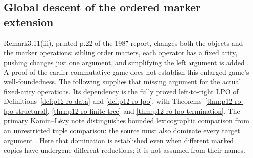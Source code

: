 \subsection{Global descent of the ordered marker extension}
\label{sec:p12-klop1987-ordered-marker-proof}

Remark3.11(iii), printed p.22 of the 1987 report, changes both the
objects and the marker operations: sibling order matters, each operator
has a fixed arity, pushing changes just one argument, and simplifying
the left argument is added \parencite{Klop1987CWITutorial}. A proof of
the earlier commutative game does not establish this enlarged game's
well-foundedness. The following supplies that missing argument for
the actual fixed-arity operations. Its dependency is the fully proved
left-to-right LPO of Definitions~\ref{def:p12-ro-data} and
\ref{def:p12-ro-lpo}, with Theorems~\ref{thm:p12-ro-lpo-structural},
\ref{thm:p12-ro-finite-tree} and \ref{thm:p12-ro-lpo-termination}.
The primary Kamin--L\'evy note distinguishes bounded lexicographic
comparison from an unrestricted tuple comparison: the source must also
dominate every target argument
\parencite[handwritten pp.1--8]{KaminLevy1980OrderedMarkers}.
Here that domination is established even when different marked copies
have undergone different reductions; it is not assumed from their names.

